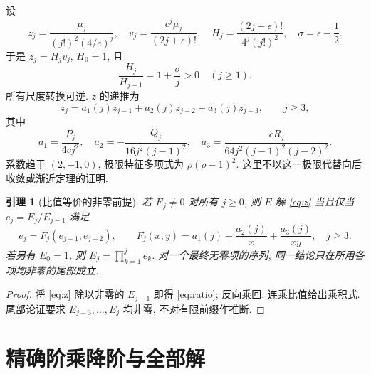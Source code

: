 \documentclass[UTF8]{ctexart}
\newtheorem{lemma}[theorem]{引理}
\newcommand{\eps}{\epsilon}
\newcommand{\sig}{\sigma}
\begin{document}
设
\begin{equation}\label{eq:scales}
 z_j=\frac{\mu_j}{(j!)^2(4/c)^j},\quad
 v_j=\frac{c^j\mu_j}{(2j+\eps)!},\quad
 H_j=\frac{(2j+\eps)!}{4^j(j!)^2},\quad
 \sig=\eps-\frac12.
\end{equation}
于是 $z_j=H_jv_j$, $H_0=1$, 且
\begin{equation}\label{eq:Hratio}
 \frac{H_j}{H_{j-1}}=1+\frac{\sig}{j}>0\quad(j\ge1).
\end{equation}
所有尺度转换可逆. $z$ 的递推为
\begin{equation}\label{eq:z}
 z_j=a_1(j)z_{j-1}+a_2(j)z_{j-2}+a_3(j)z_{j-3},\qquad j\ge3,
\end{equation}
其中
\[
 a_1=\frac{P_j}{4cj^2},\quad
 a_2=-\frac{Q_j}{16j^2(j-1)^2},\quad
 a_3=\frac{cR_j}{64j^2(j-1)^2(j-2)^2}.
\]
系数趋于 $(2,-1,0)$, 极限特征多项式为 $\rho(\rho-1)^2$.
这里不以这一极限代替向后收敛或渐近定理的证明.

\begin{lemma}[比值等价的非零前提]\label{lem:fp}
 若 $E_j\ne0$ 对所有 $j\ge0$, 则 $E$ 解 \eqref{eq:z} 当且仅当
 $e_j=E_j/E_{j-1}$ 满足
\begin{equation}\label{eq:ratio}
 e_j=F_j(e_{j-1},e_{j-2}),\qquad
 F_j(x,y)=a_1(j)+\frac{a_2(j)}x+\frac{a_3(j)}{xy},\quad j\ge3.
\end{equation}
 若另有 $E_0=1$, 则 $E_j=\prod_{k=1}^je_k$.
 对一个最终无零项的序列, 同一结论只在所用各项均非零的尾部成立.
\end{lemma}
\begin{proof}
 将 \eqref{eq:z} 除以非零的 $E_{j-1}$ 即得 \eqref{eq:ratio};
 反向乘回. 连乘比值给出乘积式.
 尾部论证要求 $E_{j-3},\ldots,E_j$ 均非零, 不对有限前缀作推断.
\end{proof}

\section{精确阶乘降阶与全部解}
\end{document}
